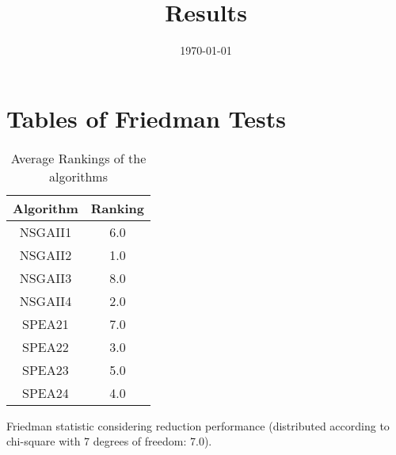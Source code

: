 \documentclass{article}
\title{Results}
\author{}
\date{\today}
\begin{document}
\oddsidemargin 0in \topmargin 0in\maketitle
\section{Tables of Friedman Tests}
\begin{table}[!htp]
\centering
\caption{Average Rankings of the algorithms
}\begin{tabular}{c|c}
Algorithm&Ranking\\
\hline
NSGAII1&6.0\\
NSGAII2&1.0\\
NSGAII3&8.0\\
NSGAII4&2.0\\
SPEA21&7.0\\
SPEA22&3.0\\
SPEA23&5.0\\
SPEA24&4.0\\
\end{tabular}
\end{table}


Friedman statistic considering reduction performance (distributed according to chi-square with 7 degrees of freedom: 7.0).
\end{document}
